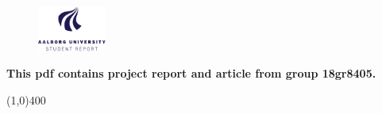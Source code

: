 \clearpage
\thispagestyle{empty}

\begin{figure}[H]
	\raggedleft
	\includegraphics[width=0.2\textwidth]{setup/aau_logo_en.pdf}
\end{figure} 

\vspace{5 cm}

\begin{center}	
	\begin{Huge}
		\textbf{This pdf contains project report and article from group 18gr8405.}\\
		\vspace{3 mm}
	\end{Huge}
\end{center}
\vspace*{\fill}

\begin{center}
	\line(1,0){400}
\end{center}
